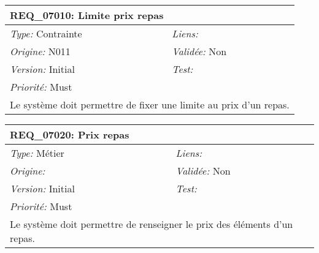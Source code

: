 \begin{table}[!h]

\begin{tabular}{|p{60mm}p{100mm}|}

\hline

\multicolumn{2}{|l|}{\textbf{REQ\_07010:} Limite prix repas} \\ \hline

\emph{Type:} Contrainte & \emph{Liens:}  \\

\emph{Origine:} N011 & \emph{Validée:} Non \\

\emph{Version:} Initial & \emph{Test:}  \\

\emph{Priorité:} Must & \\ \hline

\multicolumn{2}{|p{16cm}|}{Le système doit permettre de fixer une limite au prix d'un repas.} \\ \hline

\end{tabular}

\end{table}



\begin{table}[!h]

\begin{tabular}{|p{60mm}p{100mm}|}

\hline

\multicolumn{2}{|l|}{\textbf{REQ\_07020:} Prix repas} \\ \hline

\emph{Type:} Métier & \emph{Liens:}  \\

\emph{Origine:}  & \emph{Validée:} Non \\

\emph{Version:} Initial & \emph{Test:}  \\

\emph{Priorité:} Must & \\ \hline

\multicolumn{2}{|p{16cm}|}{Le système doit permettre de renseigner le prix des éléments d'un repas.} \\ \hline

\end{tabular}

\end{table}



